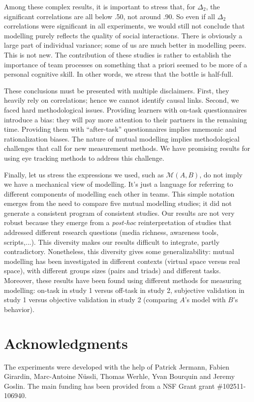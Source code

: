 \documentclass[twocolumn]{article}
\newcommand{\gmodel}[2]{{$\mathcal{M}(#1, #2)$}}
\begin{document}
Among these complex results, it is important to stress that, for $\Delta_2$, the
significant correlations are all below .50, not around .90.  So even if all
$\Delta_2$ correlations were significant in all experiments, we would still not
conclude that modelling purely reflects the quality of social interactions.
There is obviously a large part of individual variance; some of us are much
better in modelling peers. This is not new. The contribution of these studies is
rather to establish the importance of team processes on something that a priori
seemed to be more of a personal cognitive skill.  In other words, we stress that
the bottle is half-full. 

These conclusions must be presented with multiple disclaimers. First, they
heavily rely on correlations; hence we cannot identify causal links. Second, we
faced hard methodological issues. Providing learners with on-task questionnaires
introduce a bias: they will pay more attention to their partners in the
remaining time. Providing them with ``after-task'' questionnaires implies mnemonic
and rationalization biases. The nature of mutual modelling implies methodological
challenges that call for new  measurement methods. We have promising results for
using eye tracking methods to address this challenge.

Finally, let us stress the expressions we used, such as \gmodel{A}{B}, do not
imply we have a mechanical view of modelling. It's just a language for referring
to different components of modelling each other in teams.  This simple notation
emerges from the need to compare five mutual modelling studies; it did not
generate a consistent program of consistent studies.  Our results are not very
robust because they emerge from a \emph{post-hoc} reinterpretation of studies
that addressed different research questions (media richness, awareness tools,
scripts,...). This diversity makes our results difficult to integrate, partly
contradictory. Nonetheless, this diversity gives some generalizability: mutual
modelling has been investigated in different contexts (virtual space versus real
space), with different groups sizes (pairs and triads) and different tasks.
Moreover, these results have been found using different methods for measuring
modelling: on-task in study 1 versus off-task in study 2, subjective validation
in study 1 versus objective validation in study 2 (comparing $A$'s model with $B$'s
behavior).

\section*{Acknowledgments}

The experiments were developed with the help of Patrick Jermann,  Fabien
Girardin, Marc-Antoine Nüssli, Thomas Werhle, Yvan Bourquin and  Jeremy Goslin.
The main funding has been provided from a NSF Grant grant \#102511-106940.



\end{document}
